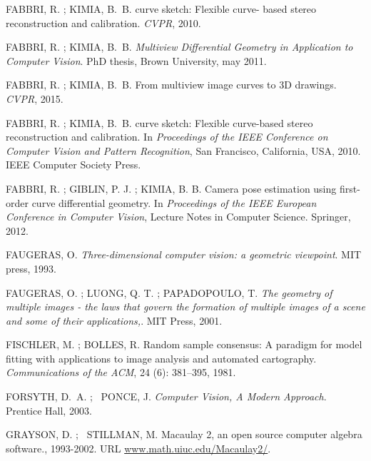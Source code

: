 \documentclass[a4paper,12pt,oneside,onecolumn,final,fleqn]{repUERJ}
\begin{document}
\begin{thebibliography}{33}
FABBRI, R. ; KIMIA, B.~B.
 curve sketch: Flexible curve- based stereo reconstruction and
  calibration.
\newblock \emph{CVPR}, 2010{}.

FABBRI, R. ; KIMIA, B.~B.
\newblock \emph{Multiview Differential Geometry in Application to Computer
  Vision}.
\newblock PhD thesis, Brown University, may 2011.

FABBRI, R. ; KIMIA, B.~B.
\newblock From multiview image curves to {3D} drawings.
\newblock \emph{CVPR}, 2015.

FABBRI, R. ; KIMIA, B.~B.
 curve sketch: Flexible curve-based stereo reconstruction and
  calibration.
\newblock In \emph{Proceedings of the IEEE Conference on Computer Vision and
  Pattern Recognition}, San Francisco, California, USA, 2010{}.
  IEEE Computer Society Press.

FABBRI, R. ; GIBLIN, P. J. ; KIMIA, B. B.
\newblock Camera pose estimation using first-order curve differential geometry.
\newblock In \emph{Proceedings of the IEEE European Conference in Computer
  Vision}, Lecture Notes in Computer Science. Springer, 2012.

FAUGERAS, O.
\newblock \emph{Three-dimensional computer vision: a geometric viewpoint}.
\newblock MIT press, 1993.

FAUGERAS, O. ; LUONG, Q. T. ; PAPADOPOULO, T.
\newblock \emph{The geometry of multiple images - the laws that govern the
  formation of multiple images of a scene and some of their applications,}.
\newblock MIT Press, 2001.

FISCHLER, M. ; BOLLES, R.
\newblock Random sample consensus: A paradigm for model fitting with
  applications to image analysis and automated cartography.
\newblock \emph{Communications of the ACM}, 24 (6): 381--395,
  1981.

FORSYTH, D.~A. ; ~PONCE, J.
\newblock \emph{Computer Vision, A Modern Approach}.
\newblock Prentice Hall, 2003.

GRAYSON, D. ; ~STILLMAN, M.
\newblock Macaulay 2, an open source computer algebra software., 1993-2002.
\newblock URL \url{www.math.uiuc.edu/Macaulay2/}.


\end{thebibliography}
\end{document}

